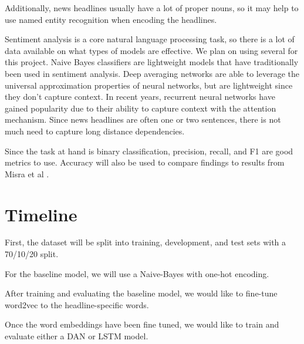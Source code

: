 \documentclass[11pt]{article}
\begin{document}
Additionally, news headlines usually have a lot of proper nouns, so it may help
to use named entity recognition when encoding the headlines.

Sentiment analysis is a core natural language processing task, so there is a
lot of data available on what types of models are effective. We plan on using
several for this project. Naive Bayes classifiers are lightweight models that
have traditionally been used in sentiment analysis. Deep averaging networks are
able to leverage the universal approximation properties of neural networks, but
are lightweight since they don't capture context. In recent years, recurrent
neural networks have gained popularity due to their ability to capture context
with the attention mechanism. Since news headlines are often one or two
sentences, there is not much need to capture long distance dependencies.

Since the task at hand is binary classification, precision, recall, and F1 are
good metrics to use. Accuracy will also be used to compare findings to results
from Misra et al \cite{misra2023Sarcasm}.

\section{Timeline}
First, the dataset will be split into training, development, and test sets with
a 70/10/20 split.

For the baseline model, we will use a Naive-Bayes with one-hot encoding.

After training and evaluating the baseline model, we would like to fine-tune
word2vec to the headline-specific words.

Once the word embeddings have been fine tuned, we would like to train and
evaluate either a DAN or LSTM model.



\end{document}
